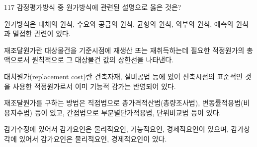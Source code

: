 \begin{question}{117}
감정평가방식 중 원가방식에 관련된 설명으로 옳은 것은?
\begin{choices}
  \item 원가방식은 대체의 원칙, 수요와 공급의 원칙, 균형의 원칙, 외부의 원칙, 예측의 원칙과 밀접한 관련이 있다.
  \item 재조달원가란 대상물건을 기준시점에 재생산 또는 재취득하는데 필요한 적정원가의 총액으로서 원칙적으로 그 대상물건 값의 상한선을 나타낸다.
  \item 대치원가(replacement cost)란 건축자재, 설비공법 등에 있어 신축시점의 표준적인 것을 사용한 적정원가로서 이미 기능적 감가는 반영되어 있다.
  \item 재조달원가를 구하는 방법은 직접법으로 총가격적산법(총량조사법), 변동률적용법(비용지수법) 등이 있고, 간접법으로 부분별단가적용법, 단위비교법 등이 있다.
  \item 감가수정에 있어서 감가요인은 물리적요인, 기능적요인, 경제적요인이 있으며, 감가상각에 있어서 감가요인은 물리적요인, 경제적요인이 있다.
\end{choices}
\end{question}
